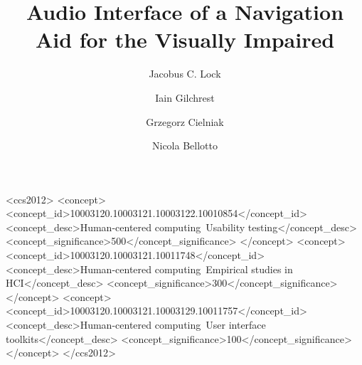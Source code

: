 \documentclass[format=sigconf, review=true, screen=true, anonymous=true]{acmart}
\begin{document}

\title[Audio Interface for the Visually Impaired]{Audio Interface of a Navigation Aid for the Visually Impaired}

\author{Jacobus C. Lock}

\author{Iain Gilchrest}

\author{Grzegorz Cielniak}

\author{Nicola Bellotto}




\begin{CCSXML}
<ccs2012>
<concept>
<concept_id>10003120.10003121.10003122.10010854</concept_id>
<concept_desc>Human-centered computing~Usability testing</concept_desc>
<concept_significance>500</concept_significance>
</concept>
<concept>
<concept_id>10003120.10003121.10011748</concept_id>
<concept_desc>Human-centered computing~Empirical studies in HCI</concept_desc>
<concept_significance>300</concept_significance>
</concept>
<concept>
<concept_id>10003120.10003121.10003129.10011757</concept_id>
<concept_desc>Human-centered computing~User interface toolkits</concept_desc>
<concept_significance>100</concept_significance>
</concept>
</ccs2012>
\end{CCSXML}
\end{document}
